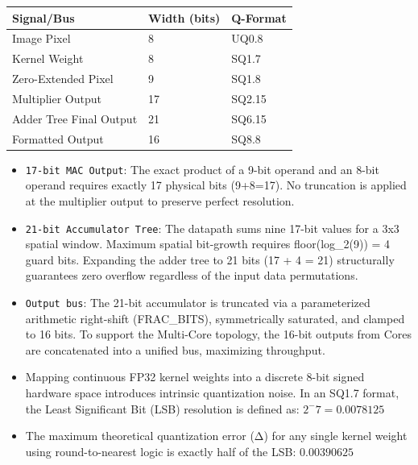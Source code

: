 \documentclass[12pt, a4paper]{article}
\begin{document}
\begin{longtable}{@{}p{} p{} p{}@{}}
\toprule
\textbf{Signal/Bus} & \textbf{Width (bits)} & \textbf{Q-Format} \\
\midrule
\endhead
Image Pixel & 8 & UQ0.8 \\
Kernel Weight & 8 & SQ1.7 \\
Zero-Extended Pixel & 9 & SQ1.8 \\
Multiplier Output & 17 & SQ2.15 \\
Adder Tree Final Output & 21 & SQ6.15 \\
Formatted Output & 16 & SQ8.8 \\
\bottomrule
\end{longtable}

\begin{itemize}
    \item \textcolor[HTML]{A31515}{\texttt{17-bit MAC Output}}: The exact product of a 9-bit operand and an 8-bit operand requires exactly 17 physical bits (9+8=17). No truncation is applied at the multiplier output to preserve perfect resolution.
    \item \textcolor[HTML]{A31515}{\texttt{21-bit Accumulator Tree}}: The datapath sums nine 17-bit values for a 3x3 spatial window. Maximum spatial bit-growth requires floor(log\_2⁡(9)) = 4 guard bits. Expanding the adder tree to 21 bits (17 + 4 = 21) structurally guarantees zero overflow regardless of the input data permutations.
    \item \textcolor[HTML]{A31515}{\texttt{Output bus}}: The 21-bit accumulator is truncated via a parameterized arithmetic right-shift (FRAC\_BITS), symmetrically saturated, and clamped to 16 bits. To support the Multi-Core topology, the 16-bit outputs from Cores are concatenated into a unified bus, maximizing throughput.
\end{itemize}

\begin{itemize}
    \item \textcolor[HTML]{A31515}{\texttt{}} Mapping continuous FP32 kernel weights into a discrete 8-bit signed hardware space introduces intrinsic quantization noise. In an SQ1.7 format, the Least Significant Bit (LSB) resolution is defined as: $2^-7 = 0.0078125$
    \item \textcolor[HTML]{A31515}{\texttt{}} The maximum theoretical quantization error (Δ) for any single kernel weight using round-to-nearest logic is exactly half of the LSB: $0.00390625$
\end{itemize}
\end{document}
